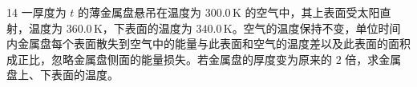 \begin{problem}[第30届全国中学生物理竞赛决赛][金属盘热传导与热平衡]{14}
一厚度为 $t$ 的薄金属盘悬吊在温度为 $300.0\,\mathrm{K}$ 的空气中，其上表面受太阳直射，温度为 $360.0\,\mathrm{K}$，下表面的温度为 $340.0\,\mathrm{K}$。空气的温度保持不变，单位时间内金属盘每个表面散失到空气中的能量与此表面和空气的温度差以及此表面的面积成正比，忽略金属盘侧面的能量损失。若金属盘的厚度变为原来的 $2$ 倍，求金属盘上、下表面的温度。
\end{problem}